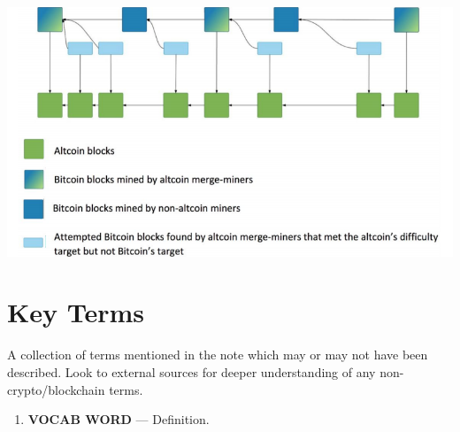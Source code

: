 \documentclass[full.tex]{subfiles}
\begin{document}
   \includegraphics[scale=0.5]{merge} \\
   
    
    
    \newpage
    \thispagestyle{firstpage}
    \vspace*{2\baselineskip}
    \section*{Key Terms}
    \noindent A collection of terms mentioned in the note which may or may not have been described. Look to external sources for deeper understanding of any non-crypto/blockchain terms.
    \begin{enumerate}
        \item \textbf{VOCAB WORD} --- Definition. %
    \end{enumerate}
\end{document}
